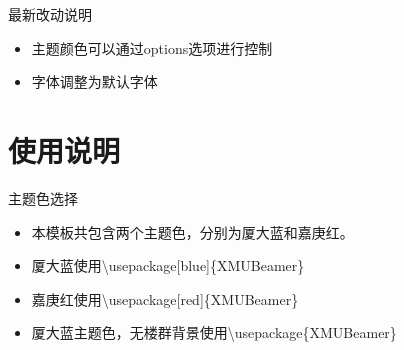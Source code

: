 \documentclass{beamer}
\begin{document}
\begin{frame}{最新改动说明}
    \begin{itemize}
        \item 主题颜色可以通过options选项进行控制
        \item 字体调整为默认字体
    \end{itemize}
\end{frame}
\section{使用说明}
\begin{frame}{主题色选择}
	\begin{itemize}
		\item 本模板共包含两个主题色，分别为厦大蓝和嘉庚红。
		\item 厦大蓝使用\textbackslash usepackage[blue]\{XMUBeamer\}
		\item 嘉庚红使用\textbackslash usepackage[red]\{XMUBeamer\}
		\item 厦大蓝主题色，无楼群背景使用\textbackslash usepackage\{XMUBeamer\}
	\end{itemize}
	

\end{frame}
\end{document}
